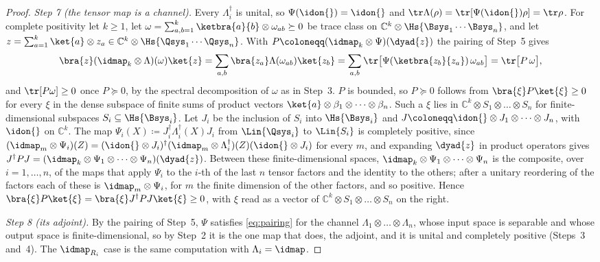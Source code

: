 \begin{proof}
\emph{Step 7 (the tensor map is a channel).} Every $\Lambda_i^{\dagger}$ is
unital, so $\Psi(\idon{})=\idon{}$ and
$\tr\Lambda(\rho)=\tr[\Psi(\idon{})\rho]=\tr\rho$. For complete positivity let
$k\ge1$, let $\omega=\sum_{a,b=1}^{k}\ketbra{a}{b}\otimes\omega_{ab}\succeq0$
be trace class on $\mathbb{C}^k\otimes\Hs{\Bsys_1\cdots\Bsys_n}$, and let
$z=\sum_{a=1}^{k}\ket{a}\otimes z_a\in\mathbb{C}^k\otimes
\Hs{\Qsys_1\cdots\Qsys_n}$. With $P\coloneqq(\idmap_k\otimes\Psi)(\dyad{z})$
the pairing of Step~5 gives
\begin{equation*}
  \bra{z}(\idmap_k\otimes\Lambda)(\omega)\ket{z}
  =\sum_{a,b}\bra{z_a}\Lambda(\omega_{ab})\ket{z_b}
  =\sum_{a,b}\tr\big[\Psi(\ketbra{z_b}{z_a})\,\omega_{ab}\big]
  =\tr\big[P\,\omega\big],
\end{equation*}
and $\tr[P\omega]\ge0$ once $P\succeq0$, by the spectral decomposition of
$\omega$ as in Step~3. $P$ is bounded, so $P\succeq0$ follows from
$\bra{\xi}P\ket{\xi}\ge0$ for every $\xi$ in the dense subspace of finite sums
of product vectors $\ket{a}\otimes\beta_1\otimes\dots\otimes\beta_n$. Such a
$\xi$ lies in $\mathbb{C}^k\otimes S_1\otimes\dots\otimes S_n$ for
finite-dimensional subspaces $S_i\subseteq\Hs{\Bsys_i}$. Let $J_i$ be the
inclusion of $S_i$ into $\Hs{\Bsys_i}$ and
$J\coloneqq\idon{}\otimes J_1\otimes\dots\otimes J_n$, with $\idon{}$ on
$\mathbb{C}^k$. The map $\Psi_i(X)\coloneqq J_i^{\dagger}\Lambda_i^{\dagger}(X)J_i$
from $\Lin{\Qsys_i}$ to $\Lin{S_i}$ is completely positive, since
$(\idmap_m\otimes\Psi_i)(Z)=(\idon{}\otimes J_i)^{\dagger}
(\idmap_m\otimes\Lambda_i^{\dagger})(Z)(\idon{}\otimes J_i)$ for every $m$,
and expanding $\dyad{z}$ in product operators gives
$J^{\dagger}PJ=(\idmap_k\otimes\Psi_1\otimes\dots\otimes\Psi_n)(\dyad{z})$.
Between these finite-dimensional spaces,
$\idmap_k\otimes\Psi_1\otimes\dots\otimes\Psi_n$ is the composite, over
$i=1,\dots,n$, of the maps that apply $\Psi_i$ to the $i$-th of the last $n$
tensor factors and the identity to the others; after a unitary reordering of
the factors each of these is $\idmap_m\otimes\Psi_i$, for $m$ the finite
dimension of the other factors, and so positive. Hence
$\bra{\xi}P\ket{\xi}=\bra{\xi}J^{\dagger}PJ\ket{\xi}\ge0$, with $\xi$ read as a
vector of $\mathbb{C}^k\otimes S_1\otimes\dots\otimes S_n$ on the right.

\emph{Step 8 (its adjoint).} By the pairing of Step~5, $\Psi$ satisfies
\eqref{eq:pairing} for the channel $\Lambda_1\otimes\dots\otimes\Lambda_n$,
whose input space is separable and whose output space is finite-dimensional,
so by Step~2 it is the one map that does, the adjoint, and it is unital and
completely positive (Steps~3 and~4). The $\idmap_{R_i}$ case is the same
computation with $\Lambda_i=\idmap$.


\end{proof}
